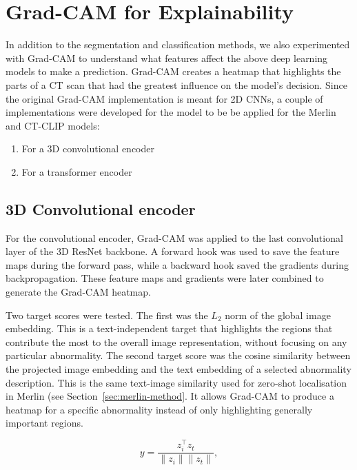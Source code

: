 \section{Grad-CAM for Explainability}
\label{sec:grad-cam}

In addition to the segmentation and classification methods, we also experimented with Grad-CAM to understand
what features affect the above deep learning models to make a prediction. Grad-CAM creates a heatmap
that highlights the parts of a CT scan that had the greatest influence on the model's decision.
Since the original Grad-CAM implementation is meant for 2D CNNs, a couple of implementations were developed
for the model to be be applied for the Merlin and CT-CLIP models:
\begin{enumerate}
    \item For a 3D convolutional encoder
    \item For a transformer encoder
\end{enumerate}

\subsection{3D Convolutional encoder}

For the convolutional encoder, Grad-CAM was applied to the last
convolutional layer of the 3D ResNet backbone. A forward hook was used to
save the feature maps during the forward pass, while a backward hook saved
the gradients during backpropagation. These feature maps and gradients were
later combined to generate the Grad-CAM heatmap.

Two target scores were tested. The first was the $L_2$ norm of the global
image embedding. This is a text-independent target that highlights the
regions that contribute the most to the overall image representation,
without focusing on any particular abnormality. The second target score was the cosine similarity between the projected
image embedding and the text embedding of a selected abnormality
description. This is the same text-image similarity used for zero-shot
localisation in Merlin (see Section~\ref{sec:merlin-method}. It allows Grad-CAM to
produce a heatmap for a specific abnormality instead of only highlighting generally important regions.

\begin{equation}[Image-Text Cosine Similarity]
y = \frac{z_i^{\top} z_t}{\lVert z_i \rVert \lVert z_t \rVert},
\end{equation}

